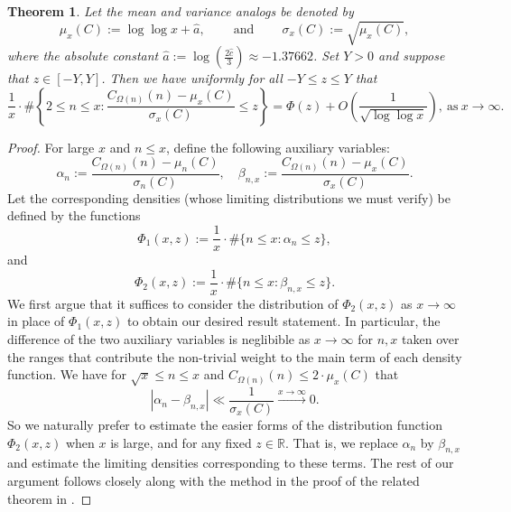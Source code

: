 \documentclass[11pt,reqno,a4letter]{article}
\numberwithin{figure}{section}
\numberwithin{table}{section}
\theoremstyle{plain}
\newtheorem{theorem}{Theorem}
\numberwithin{theorem}{section}
\theoremstyle{definition}
\begin{document}
\begin{theorem} 
\label{theorem_CLT_VI} 
Let the mean and variance analogs be denoted by 
\[
\mu_x(C) := \log\log x + \hat{a}, 
     \qquad \mathrm{\ and\ } \qquad 
     \sigma_x(C) := \sqrt{\mu_x(C)}, 
\]
where the absolute constant 
$\hat{a} := \log\left(\frac{2\hat{c}}{3}\right) \approx -1.37662$. 
Set $Y > 0$ and suppose that $z \in [-Y, Y]$. Then we have 
uniformly for all $-Y \leq z \leq Y$ that 
\[
\frac{1}{x} \cdot \#\left\{2 \leq n \leq x: 
     \frac{C_{\Omega(n)}(n) - \mu_x(C)}{\sigma_x(C)} \leq z\right\} = 
     \Phi(z) + O\left(\frac{1}{\sqrt{\log\log x}}\right), 
     \mathrm{\ as\ } x \rightarrow \infty. 
\] 
\end{theorem} 
\begin{proof} 
For large $x$ and $n \leq x$, define the following auxiliary variables: 
\[
\alpha_n := \frac{C_{\Omega(n)}(n) - \mu_n(C)}{\sigma_n(C)}, \quad 
     \beta_{n,x} := \frac{C_{\Omega(n)}(n) - \mu_x(C)}{\sigma_x(C)}. 
\] 
Let the corresponding densities (whose limiting distributions we must verify) 
be defined by the functions 
\[
\Phi_1(x, z) := \frac{1}{x} \cdot \#\{n \leq x: \alpha_n \leq z\}, 
\]
and 
\[
\Phi_2(x, z) := \frac{1}{x} \cdot \#\{n \leq x: \beta_{n,x} \leq z\}. 
\] 
We first argue that it suffices to consider the distribution of $\Phi_2(x, z)$ as 
$x \rightarrow \infty$ in place of $\Phi_1(x, z)$ to obtain our desired result statement. 
In particular, the difference of the two auxiliary variables is neglibible as 
$x \rightarrow \infty$ for $n,x$ taken over the ranges that contribute the non-trivial 
weight to the main term of each density function. We have for 
$\sqrt{x} \leq n \leq x$ and $C_{\Omega(n)}(n) \leq 2 \cdot \mu_x(C)$ that 
\[
|\alpha_n - \beta_{n,x}| \ll \frac{1}{\sigma_x(C)} \xrightarrow{x \rightarrow \infty} 0. 
\]
So we naturally prefer to estimate the easier forms of the distribution function $\Phi_2(x, z)$ 
when $x$ is large, and for any fixed $z \in \mathbb{R}$. 
That is, we replace $\alpha_n$ by $\beta_{n,x}$ and estimate the limiting 
densities corresponding to these terms. 
The rest of our argument follows closely 
along with the method in the proof of the related theorem in 
\cite[Thm.\ 7.21; \S 7.4]{MV}. 


\end{proof}
\end{document}
